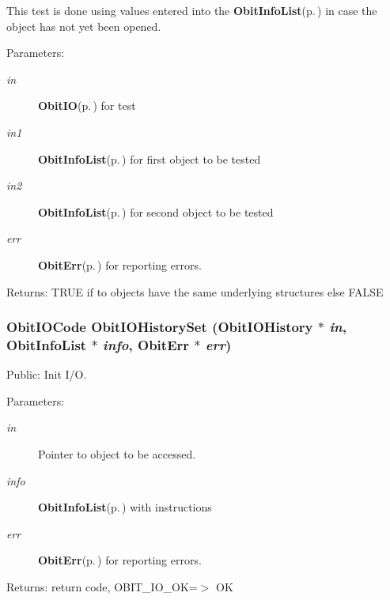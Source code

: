 This test is done using values entered into the {\bf Obit\-Info\-List}{\rm (p.\,\pageref{structObitInfoList})} in case the object has not yet been opened. \begin{Desc}
\item[Parameters:]
\begin{description}
\item[{\em in}]{\bf Obit\-IO}{\rm (p.\,\pageref{structObitIO})} for test \item[{\em in1}]{\bf Obit\-Info\-List}{\rm (p.\,\pageref{structObitInfoList})} for first object to be tested \item[{\em in2}]{\bf Obit\-Info\-List}{\rm (p.\,\pageref{structObitInfoList})} for second object to be tested \item[{\em err}]{\bf Obit\-Err}{\rm (p.\,\pageref{structObitErr})} for reporting errors. \end{description}
\end{Desc}
\begin{Desc}
\item[Returns:]TRUE if to objects have the same underlying structures else FALSE \end{Desc}
\subsubsection{\setlength{\rightskip}{0pt plus 5cm}Obit\-IOCode Obit\-IOHistory\-Set ({\bf Obit\-IOHistory} $\ast$ {\em in}, {\bf Obit\-Info\-List} $\ast$ {\em info}, {\bf Obit\-Err} $\ast$ {\em err})}\label{ObitIOHistory_8c_a13}


Public: Init I/O. 

\begin{Desc}
\item[Parameters:]
\begin{description}
\item[{\em in}]Pointer to object to be accessed. \item[{\em info}]{\bf Obit\-Info\-List}{\rm (p.\,\pageref{structObitInfoList})} with instructions \item[{\em err}]{\bf Obit\-Err}{\rm (p.\,\pageref{structObitErr})} for reporting errors. \end{description}
\end{Desc}
\begin{Desc}
\item[Returns:]return code, OBIT\_\-IO\_\-OK=$>$ OK \end{Desc}
